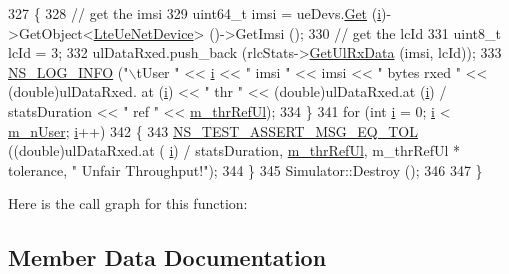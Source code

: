 \begin{DoxyCode}
327     \{
328       \textcolor{comment}{// get the imsi}
329       uint64\_t imsi = ueDevs.\hyperlink{classns3_1_1NetDeviceContainer_a677d62594b5c9d2dea155cc5045f4d0b}{Get} (\hyperlink{bernuolliDistribution_8m_a6f6ccfcf58b31cb6412107d9d5281426}{i})->GetObject<\hyperlink{classns3_1_1LteUeNetDevice}{LteUeNetDevice}> ()->GetImsi ();
330       \textcolor{comment}{// get the lcId}
331       uint8\_t lcId = 3;
332       ulDataRxed.push\_back (rlcStats->\hyperlink{classns3_1_1RadioBearerStatsCalculator_a6ce5113218813509a6fb6159f9be4807}{GetUlRxData} (imsi, lcId));
333       \hyperlink{group__logging_gafbd73ee2cf9f26b319f49086d8e860fb}{NS\_LOG\_INFO} (\textcolor{stringliteral}{"\(\backslash\)tUser "} << \hyperlink{bernuolliDistribution_8m_a6f6ccfcf58b31cb6412107d9d5281426}{i} << \textcolor{stringliteral}{" imsi "} << imsi << \textcolor{stringliteral}{" bytes rxed "} << (\textcolor{keywordtype}{double})ulDataRxed.
      at (\hyperlink{bernuolliDistribution_8m_a6f6ccfcf58b31cb6412107d9d5281426}{i}) << \textcolor{stringliteral}{"  thr "} << (double)ulDataRxed.at (\hyperlink{bernuolliDistribution_8m_a6f6ccfcf58b31cb6412107d9d5281426}{i}) / statsDuration << \textcolor{stringliteral}{" ref "} << 
      \hyperlink{classLenaPfFfMacSchedulerTestCase1_a4a0d1aacb09837bc328ced85f024488b}{m\_thrRefUl});
334     \}
341   \textcolor{keywordflow}{for} (\textcolor{keywordtype}{int} \hyperlink{bernuolliDistribution_8m_a6f6ccfcf58b31cb6412107d9d5281426}{i} = 0; \hyperlink{bernuolliDistribution_8m_a6f6ccfcf58b31cb6412107d9d5281426}{i} < \hyperlink{classLenaPfFfMacSchedulerTestCase1_a1d8b06961a8b7e440f643688069b9c7a}{m\_nUser}; \hyperlink{bernuolliDistribution_8m_a6f6ccfcf58b31cb6412107d9d5281426}{i}++)
342     \{
343       \hyperlink{group__testing_ga9e7861b56b4e70db3b56044cb7a28e41}{NS\_TEST\_ASSERT\_MSG\_EQ\_TOL} ((\textcolor{keywordtype}{double})ulDataRxed.at (
      \hyperlink{bernuolliDistribution_8m_a6f6ccfcf58b31cb6412107d9d5281426}{i}) / statsDuration, \hyperlink{classLenaPfFfMacSchedulerTestCase1_a4a0d1aacb09837bc328ced85f024488b}{m\_thrRefUl}, m\_thrRefUl * tolerance, \textcolor{stringliteral}{" Unfair Throughput!"});
344     \}
345   Simulator::Destroy ();
346 
347 \}
\end{DoxyCode}


Here is the call graph for this function\+:




\subsection{Member Data Documentation}
